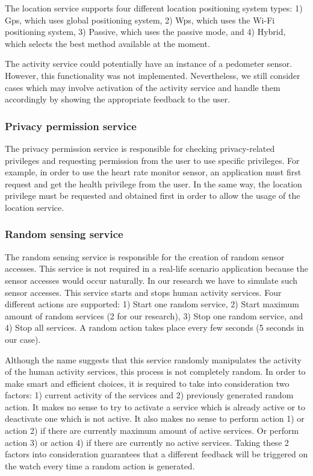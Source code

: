 \documentclass[conference, a4paper, 10pt, twocolumn]{IEEEtran}
\begin{document}
The location service supports four different location positioning system types: 1) Gps, which uses global positioning system, 2) Wps, which uses the Wi-Fi positioning system, 3) Passive, which uses the passive mode, and 4) Hybrid, which selects the best method available at the moment. 

The activity service could potentially have an instance of a pedometer sensor. However, this functionality was not implemented. Nevertheless, we still consider cases which may involve activation of the activity service and handle them accordingly by showing the appropriate feedback to the user. 

\subsubsection{Privacy permission service}
The privacy permission service is responsible for checking privacy-related privileges and requesting permission from the user to use specific privileges. For example, in order to use the heart rate monitor sensor, an application must first request and get the health privilege from the user. In the same way, the location privilege must be requested and obtained first in order to allow the usage of the location service.

\subsubsection{Random sensing service}
The random sensing service is responsible for the creation of random sensor accesses. This service is not required in a real-life scenario application because the sensor accesses would occur naturally. In our research we have to simulate such sensor accesses. This service starts and stops human activity services. Four different actions are supported: 1) Start one random service, 2) Start maximum amount of random services (2 for our research), 3) Stop one random service, and 4) Stop all services. A random action takes place every few seconds (5 seconds in our case).

Although the name suggests that this service randomly manipulates the activity of the human activity services, this process is not completely random. In order to make smart and efficient choices, it is required to take into consideration two factors: 1) current activity of the services and 2) previously generated random action. It makes no sense to try to activate a service which is already active or to deactivate one which is not active. It also makes no sense to perform action 1) or action 2) if there are currently maximum amount of active services. Or perform action 3) or action 4) if there are currently no active services. Taking these 2 factors into consideration guarantees that a different feedback will be triggered on the watch every time a random action is generated.
\end{document}
